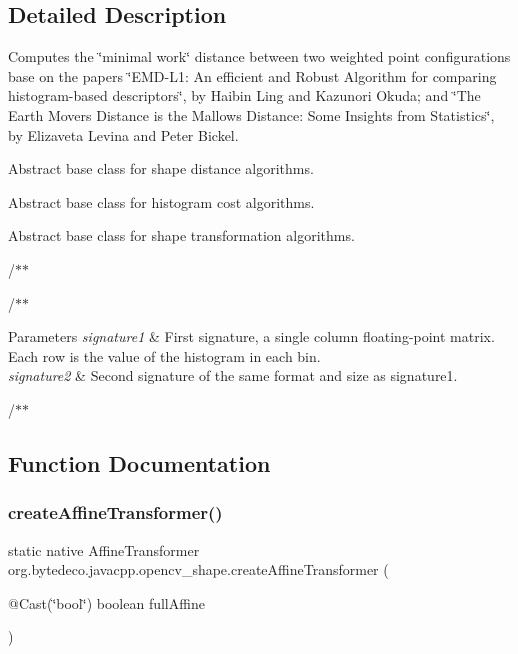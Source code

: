 \subsection{Detailed Description}
Computes the \char`\"{}minimal work\char`\"{} distance between two weighted point configurations base on the papers \char`\"{}\+E\+M\+D-\/\+L1\+: An efficient and Robust Algorithm for comparing histogram-\/based descriptors\char`\"{}, by Haibin Ling and Kazunori Okuda; and \char`\"{}\+The Earth Mover\textquotesingle{}s Distance is the Mallows Distance\+: Some Insights from
\+Statistics\char`\"{}, by Elizaveta Levina and Peter Bickel. 

Abstract base class for shape distance algorithms.

Abstract base class for histogram cost algorithms.

Abstract base class for shape transformation algorithms.

/$\ast$$\ast$ 

/$\ast$$\ast$


\begin{DoxyParams}{Parameters}
{\em signature1} & First signature, a single column floating-\/point matrix. Each row is the value of the histogram in each bin. \\
\hline
{\em signature2} & Second signature of the same format and size as signature1.\\
\hline
\end{DoxyParams}


/$\ast$$\ast$ 

\subsection{Function Documentation}
\mbox{\label{group__shape_gaf6ba7c375194bc18e7f3212dfadfa68f}} 
\subsubsection{\texorpdfstring{create\+Affine\+Transformer()}{createAffineTransformer()}}
{\footnotesize\ttfamily static native Affine\+Transformer org.\+bytedeco.\+javacpp.\+opencv\+\_\+shape.\+create\+Affine\+Transformer (\begin{DoxyParamCaption}\item[{@Cast(\char`\"{}bool\char`\"{}) boolean}]{full\+Affine }\end{DoxyParamCaption})\hspace{0.3cm}{\ttfamily [static]}}

